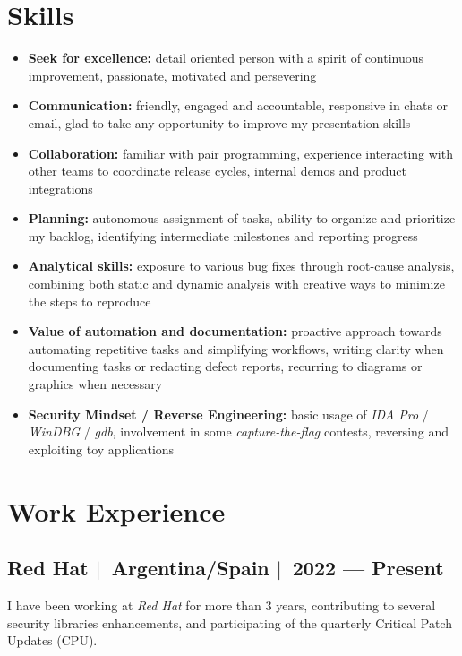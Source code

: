 \documentclass[12pt, a4paper]{article}
\newcommand{\mysep}{{\Large $\mid$}\ }
\newcommand{\titledItem}[2]{\item \textbf{#1:} #2}
\begin{document}
    \section*{Skills} \label{sec:skills}
    \begin{itemize}
        \titledItem{Seek for excellence}{%
            detail oriented person with a spirit of continuous improvement,
            passionate, motivated and persevering
        }
        \titledItem{Communication}{%
            friendly, engaged and accountable,
            responsive in chats or email,
            glad to take any opportunity to improve my presentation skills
        }
        \titledItem{Collaboration}{%
            familiar with pair programming,
            experience interacting with other teams to coordinate release cycles,
            internal demos and product integrations
        }
        \titledItem{Planning}{%
            autonomous assignment of tasks,
            ability to organize and prioritize my backlog,
            identifying intermediate milestones and reporting progress
        }
        \titledItem{Analytical skills}{%
            exposure to various bug fixes through root-cause analysis,
            combining both static and dynamic analysis with
            creative ways to minimize the steps to reproduce
        }
        \titledItem{Value of automation and documentation}{%
            proactive approach towards automating repetitive tasks and simplifying workflows,
            writing clarity when documenting tasks or redacting defect reports,
            recurring to diagrams or graphics when necessary
        }
        \titledItem{Security Mindset / Reverse Engineering}{%
            basic usage of \emph{IDA Pro} / \emph{WinDBG} / \emph{gdb},
            involvement in some \emph{capture-the-flag} contests,
            reversing and exploiting toy applications
        }
    \end{itemize}

    \section*{Work Experience} \label{sec:experience}

    \subsection*{Red Hat \mysep Argentina/Spain \mysep 2022 --- Present} \label{subsec:job1}
    I have been working at \emph{Red Hat} for more than 3 years,
    contributing to several security libraries enhancements,
    and participating of the quarterly Critical Patch Updates (CPU).
\end{document}
